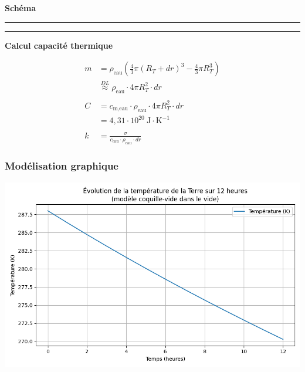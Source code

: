 \documentclass[a4paper,12pt]{article}
\begin{document}
\textbf{Schéma}

\noindent\textcolor{gray}{\rule{\linewidth}{0.4pt}}

    
\begin{center}
  
\end{center}



\noindent\textcolor{gray}{\rule{\linewidth}{0.4pt}} 




\textbf{Calcul capacité thermique}

\begin{align*}
m &= \rho_{\text{eau}} \left( \frac{4}{3} \pi (R_T + dr)^3 - \frac{4}{3} \pi R_T^3 \right) \\
&\overset{DL}{\approx} \rho_{\text{eau}} \cdot 4\pi R_T^2 \cdot dr \\
\\
C &= c_{\text{m,eau}} \cdot \rho_{\text{eau}} \cdot 4\pi R_T^2 \cdot dr \\
&= 4{,}31 \cdot 10^{20} \ \text{J} \cdot \text{K}^{-1} \\
\\
k &= \frac{\sigma }{c_{\text{eau}} \cdot \rho_{\text{eau}} \cdot dr}
\end{align*}
\vspace{0.5cm}
\subsubsection*{Modélisation graphique}   
\begin{center}
  \includegraphics[width=0.8\linewidth]{../modele1/figures/modele1_coquille.png} 
\end{center}
\end{document}
